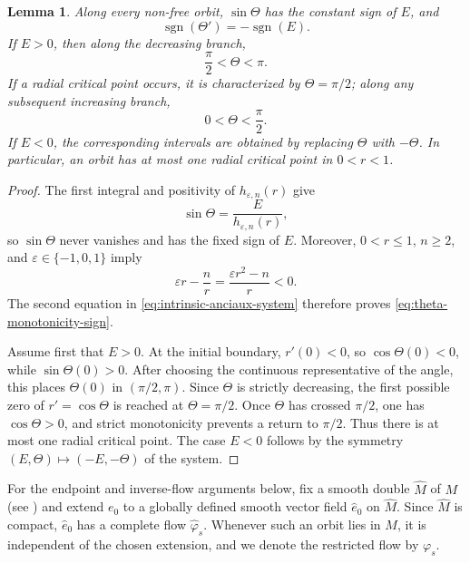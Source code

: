 \documentclass[11pt,a4paper]{article}
\numberwithin{equation}{section}
\newtheorem{lemma}[theorem]{Lemma}
\begin{document}
\begin{lemma}\label{lem:phase-monotonicity}
Along every non-free orbit, $\sin\Theta$ has the constant sign of $E$, and
\begin{equation}\label{eq:theta-monotonicity-sign}
        \operatorname{sgn}(\Theta')=-\operatorname{sgn}(E).
\end{equation}
If $E>0$, then along the decreasing branch,
$$
        \frac\pi2<\Theta<\pi.
$$
If a radial critical point occurs, it is characterized by $\Theta=\pi/2$;
along any subsequent increasing branch,
$$
        0<\Theta<\frac\pi2.
$$
If $E<0$, the corresponding intervals are obtained by replacing $\Theta$ with
$-\Theta$.  In particular, an orbit has at most one radial critical point in
$0<r<1$.
\end{lemma}

\begin{proof}
The first integral and positivity of $h_{\varepsilon,n}(r)$ give
$$
        \sin\Theta=\frac{E}{h_{\varepsilon,n}(r)},
$$
so $\sin\Theta$ never vanishes and has the fixed sign of $E$.  Moreover,
$0<r\le1$, $n\ge2$, and $\varepsilon\in\{-1,0,1\}$ imply
$$
        \varepsilon r-\frac nr
        =\frac{\varepsilon r^2-n}{r}<0.
$$
The second equation in \eqref{eq:intrinsic-anciaux-system} therefore proves
\eqref{eq:theta-monotonicity-sign}.

Assume first that $E>0$.  At the initial boundary, $r'(0)<0$, so
$\cos\Theta(0)<0$, while $\sin\Theta(0)>0$.  After choosing the continuous
representative of the angle, this places $\Theta(0)$ in $(\pi/2,\pi)$.  Since
$\Theta$ is strictly decreasing, the first possible zero of $r'=\cos\Theta$
is reached at $\Theta=\pi/2$.  Once $\Theta$ has crossed $\pi/2$, one has
$\cos\Theta>0$, and strict monotonicity prevents a return to $\pi/2$.  Thus
there is at most one radial critical point.  The case $E<0$ follows by the
symmetry $(E,\Theta)\mapsto(-E,-\Theta)$ of the system.
\end{proof}

For the endpoint and inverse-flow arguments below, fix a smooth double
$\widehat M$ of $M$ (see \cite{Munkres}) and extend $e_0$ to a globally
defined smooth vector field $\widehat e_0$ on $\widehat M$.  Since
$\widehat M$ is compact, $\widehat e_0$ has a complete flow
$\widehat\varphi_s$.  Whenever such an orbit lies in $M$, it is independent
of the chosen extension, and we denote the restricted flow by $\varphi_s$.
\end{document}
